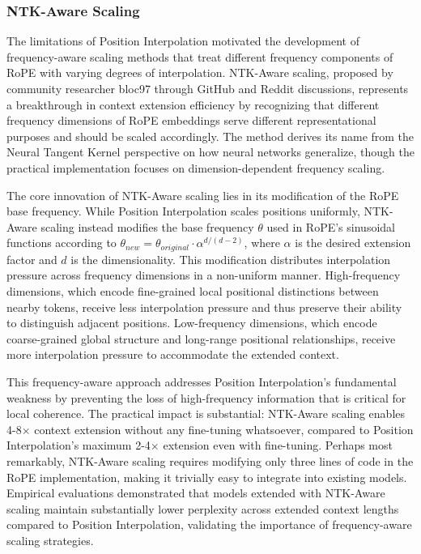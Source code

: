 \subsubsection{NTK-Aware Scaling}

The limitations of Position Interpolation motivated the development of frequency-aware scaling methods that treat different frequency components of RoPE with varying degrees of interpolation. NTK-Aware scaling, proposed by community researcher bloc97 through GitHub and Reddit discussions, represents a breakthrough in context extension efficiency by recognizing that different frequency dimensions of RoPE embeddings serve different representational purposes and should be scaled accordingly. The method derives its name from the Neural Tangent Kernel perspective on how neural networks generalize, though the practical implementation focuses on dimension-dependent frequency scaling.

The core innovation of NTK-Aware scaling lies in its modification of the RoPE base frequency. While Position Interpolation scales positions uniformly, NTK-Aware scaling instead modifies the base frequency $\theta$ used in RoPE's sinusoidal functions according to $\theta_{new} = \theta_{original} \cdot \alpha^{d/(d-2)}$, where $\alpha$ is the desired extension factor and $d$ is the dimensionality. This modification distributes interpolation pressure across frequency dimensions in a non-uniform manner. High-frequency dimensions, which encode fine-grained local positional distinctions between nearby tokens, receive less interpolation pressure and thus preserve their ability to distinguish adjacent positions. Low-frequency dimensions, which encode coarse-grained global structure and long-range positional relationships, receive more interpolation pressure to accommodate the extended context.

This frequency-aware approach addresses Position Interpolation's fundamental weakness by preventing the loss of high-frequency information that is critical for local coherence. The practical impact is substantial: NTK-Aware scaling enables 4-8$\times$ context extension without any fine-tuning whatsoever, compared to Position Interpolation's maximum 2-4$\times$ extension even with fine-tuning. Perhaps most remarkably, NTK-Aware scaling requires modifying only three lines of code in the RoPE implementation, making it trivially easy to integrate into existing models. Empirical evaluations demonstrated that models extended with NTK-Aware scaling maintain substantially lower perplexity across extended context lengths compared to Position Interpolation, validating the importance of frequency-aware scaling strategies.

